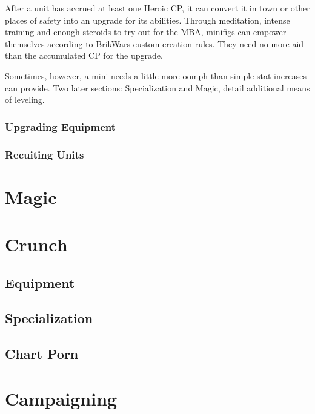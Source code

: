 \documentclass[12pt,a4paper,twocolumn]{article}
\begin{document}
After a unit has accrued at least one Heroic CP, it can convert it in town or other places of safety into an upgrade for its abilities.  Through meditation, intense training and enough steroids to try out for the MBA, minifigs can empower themselves according to BrikWars custom creation rules.  They need no more aid than the accumulated CP for the upgrade. 

Sometimes, however, a mini needs a little more oomph than simple stat increases can provide.  Two later sections: Specialization and Magic, detail additional means of leveling.

\subsubsection{Upgrading Equipment}

\subsubsection{Recuiting Units}

\section {Magic}

\section {Crunch}
\subsection{Equipment}
\subsection{Specialization}
\subsection{Chart Porn}

\section {Campaigning }
\end{document}
